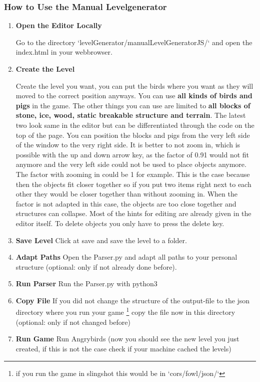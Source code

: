 \subsubsection{How to Use the Manual Levelgenerator}
\begin{enumerate}
	\item \textbf{Open the Editor Locally}
	
	Go to the directory `levelGenerator/manualLevelGeneratorJS/` and open the index.html in your webbrowser.
	\item \textbf{Create the Level}
	
	Create the level you want, you can put the birds where you want as they will moved to the correct position anyways. You can use \textbf{all kinds of birds and pigs} in the game. The other things you can use are limited to \textbf{all blocks of stone, ice, wood, static breakable structure and terrain}. The latest two look same in the editor but can be differentiated through the code on the top of the page.
	You can position the blocks and pigs from the very left side of the window to the very right side. It is better to not zoom in, which is possible with the up and down arrow key, as the factor of 0.91 would not fit anymore and the very left side could not be used to place objects anymore. The factor with zooming in could be 1 for example. This is the case because then the objects fit closer together so if you put two items right next to each other they would be closer together than without zooming in. When the factor is not adapted in this case, the objects are too close together and structures can collapse.
	Most of the hints for editing are already given in the editor itself. To delete objects you only have to press the delete key.
	
	\item \textbf{Save Level} Click at save and save the level to a folder.
	
	\item \textbf{Adapt Paths} Open the Parser.py and adapt all paths to your personal structure (optional: only if not already done before).

	\item \textbf{Run Parser} Run the Parser.py with python3

	\item \textbf{Copy File} If you did not change the structure of the output-file to the json directory where you run your game \footnote{if you run the game in slingshot this would be in `cors/fowl/json/`} copy the file now in this directory (optional: only if not changed before)

	\item \textbf{Run Game} Run Angrybirds (now you should see the new level you just created, if this is not the case check if your machine cached the levels)
	
\end{enumerate}

